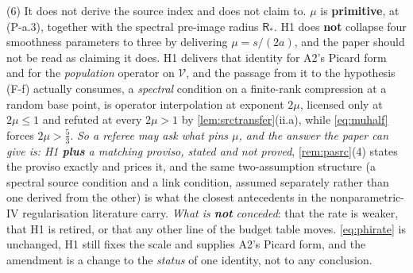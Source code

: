 \begin{remark}
(6) It does not derive the source index and does not claim to. $\mu$ is
\textbf{primitive}, at (P-a.3), together with the spectral pre-image radius $\mathsf R_\ast$. H1
does \textbf{not} collapse four smoothness parameters to three by
delivering $\mu=s/(2a)$, and the paper should not be read as claiming it does.
H1 delivers that identity for A2's Picard form and for the
\emph{population} operator on $\mathcal V$, and the passage from it to the hypothesis (F-f) actually
consumes, a \emph{spectral} condition on a finite-rank compression at a random base point, is
operator interpolation at exponent $2\mu$, licensed only at $2\mu\le1$ and refuted at every $2\mu>1$ by
\cref{lem:srctransfer}(ii.a), while \eqref{eq:muhalf} forces $2\mu>\tfrac53$. \emph{So a referee may ask
what pins $\mu$, and the answer the paper can give is: H1 \textbf{plus} a matching proviso, stated and
not proved}, \cref{rem:pasrc}(4) states the proviso exactly and prices it, and the same two-assumption
structure (a spectral source condition and a link condition, assumed separately rather than one derived
from the other) is what the closest antecedents in the nonparametric-IV regularisation literature carry.
\emph{What is \textbf{not} conceded}: that the rate is weaker, that H1 is retired, or that any other line
of the budget table moves. \eqref{eq:phirate} is unchanged, H1 still fixes the scale and supplies A2's
Picard form, and the amendment is a change to the \emph{status} of one identity, not to any conclusion.
\end{remark}


